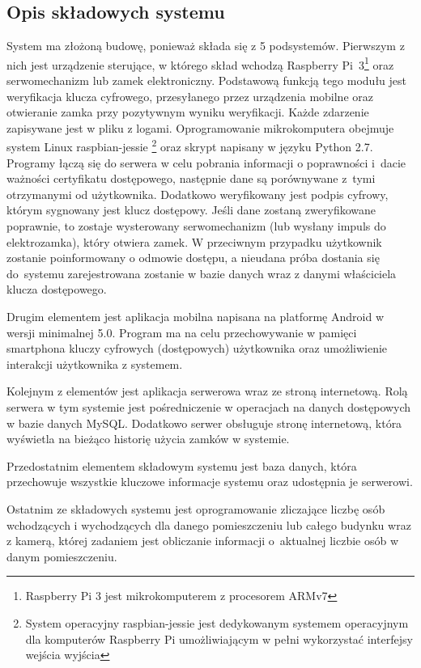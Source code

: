 \subsection{Opis składowych systemu}
System ma złożoną budowę, ponieważ składa się z 5 podsystemów. Pierwszym z nich jest urządzenie sterujące, w którego skład wchodzą Raspberry Pi~3\footnote{ Raspberry Pi 3 jest mikrokomputerem z procesorem ARMv7} oraz serwomechanizm lub zamek elektroniczny. Podstawową funkcją tego modułu jest weryfikacja klucza cyfrowego, przesyłanego przez urządzenia mobilne oraz otwieranie zamka przy pozytywnym wyniku weryfikacji. Każde zdarzenie zapisywane jest w pliku z logami. Oprogramowanie mikrokomputera obejmuje system Linux raspbian-jessie \footnote{ System operacyjny raspbian-jessie jest dedykowanym systemem operacyjnym dla komputerów Raspberry Pi umożliwiającym w pełni wykorzystać interfejsy wejścia wyjścia} oraz skrypt napisany w języku Python 2.7. Programy łączą się do serwera w celu pobrania informacji o poprawności i~dacie ważności certyfikatu dostępowego, następnie dane są porównywane z~tymi otrzymanymi od użytkownika. Dodatkowo weryfikowany jest podpis cyfrowy, którym sygnowany jest klucz dostępowy. Jeśli dane zostaną zweryfikowane poprawnie, to zostaje wysterowany serwomechanizm (lub wysłany impuls do elektrozamka), który otwiera zamek. W przeciwnym przypadku użytkownik zostanie poinformowany o odmowie dostępu, a nieudana próba dostania się do~systemu zarejestrowana zostanie w bazie danych wraz z danymi właściciela klucza dostępowego.

Drugim elementem jest aplikacja mobilna napisana na platformę Android w wersji minimalnej 5.0. Program ma na celu przechowywanie w pamięci smartphona kluczy cyfrowych (dostępowych) użytkownika oraz umożliwienie interakcji użytkownika z systemem.

Kolejnym z elementów jest aplikacja serwerowa wraz ze stroną internetową. Rolą serwera w tym systemie jest pośredniczenie w operacjach na danych dostępowych w bazie danych MySQL. Dodatkowo serwer obsługuje stronę internetową, która wyświetla na bieżąco historię użycia zamków w systemie.

Przedostatnim elementem składowym systemu jest baza danych, która przechowuje wszystkie kluczowe informacje systemu oraz udostępnia je serwerowi.

Ostatnim ze składowych systemu jest oprogramowanie zliczające liczbę osób wchodzących i wychodzących dla danego pomieszczeniu lub całego budynku wraz z kamerą, której zadaniem jest obliczanie informacji o~aktualnej liczbie osób w danym pomieszczeniu. 

